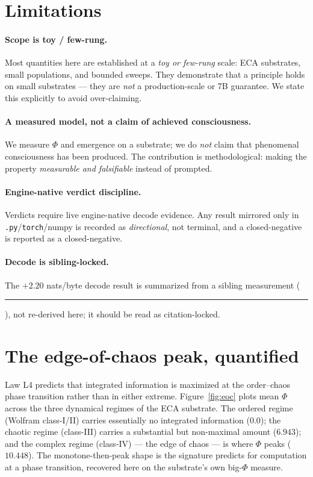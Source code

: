 \documentclass[11pt,a4paper]{article}
\newcommand{\tierdisc}[1]{\textcolor{#1}{\rule[0.05ex]{1.0ex}{1.0ex}}}
\newcommand{\tierYellow}{\tierdisc{yellow!85!black}}
\begin{document}
\section{Limitations}
\label{sec:limits}
\paragraph{Scope is toy / few-rung.}
Most quantities here are established at a \emph{toy or few-rung} scale: ECA
substrates, small populations, and bounded sweeps. They demonstrate that a
principle holds on small substrates --- they are \emph{not} a production-scale
or 7B guarantee. We state this explicitly to avoid over-claiming.

\paragraph{A measured model, not a claim of achieved consciousness.}
We measure $\Phi$ and emergence on a substrate; we do \emph{not} claim that
phenomenal consciousness has been produced. The contribution is methodological:
making the property \emph{measurable and falsifiable} instead of prompted.

\paragraph{Engine-native verdict discipline.}
Verdicts require live engine-native decode evidence. Any result mirrored only in
\texttt{.py}/\texttt{torch}/numpy is recorded as \emph{directional}, not
terminal, and a closed-negative is reported as a closed-negative.

\paragraph{Decode is sibling-locked.}
The $+2.20$ nats/byte decode result is summarized from a sibling measurement
(\tierYellow{}), not re-derived here; it should be read as citation-locked.

\section{The edge-of-chaos peak, quantified}
\label{sec:eoc}
Law L4 predicts that integrated information is maximized at the order--chaos
phase transition rather than in either extreme. Figure~\ref{fig:eoc} plots mean
$\Phi$ across the three dynamical regimes of the ECA substrate. The ordered
regime (Wolfram class-I/II) carries essentially no integrated information
($0.0$); the chaotic regime (class-III) carries a substantial but non-maximal
amount ($6.943$); and the complex regime (class-IV) --- the edge of chaos --- is
where $\Phi$ peaks ($10.448$). The monotone-then-peak shape is the signature
\citet{langton1990edge} predicts for computation at a phase transition, recovered
here on the substrate's own big-$\Phi$ measure.
\end{document}
